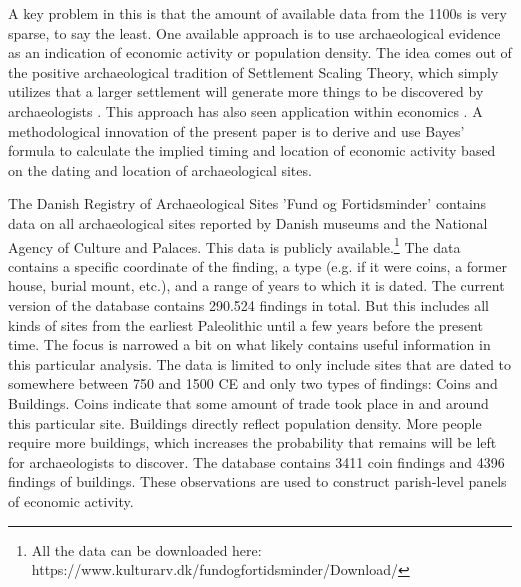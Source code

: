 \documentclass[11pt]{article}
\begin{document}
A key problem in this is that the amount of available data from the 1100s is very sparse, to say the least. One available approach is to use archaeological evidence as an indication of economic activity or population density. The idea comes out of the positive archaeological tradition of Settlement Scaling Theory, which simply utilizes that a larger settlement will generate more things to be discovered by archaeologists \citep{Ortman2020}. This approach has also seen application within economics \citep{Davis2002, Bakker2021Phonecians, Allen2023, Barjamovic2019}. A methodological innovation of the present paper is to derive and use Bayes' formula to calculate the implied timing and location of economic activity based on the dating and location of archaeological sites.

The Danish Registry of Archaeological Sites 'Fund og Fortidsminder' contains data on all archaeological sites reported by Danish museums and the National Agency of Culture and Palaces. This data is publicly available.\footnote{All the data can be downloaded here: https://www.kulturarv.dk/fundogfortidsminder/Download/} The data contains a specific coordinate of the finding, a type (e.g. if it were coins, a former house, burial mount, etc.), and a range of years to which it is dated. The current version of the database contains 290.524 findings in total. But this includes all kinds of sites from the earliest Paleolithic until a few years before the present time. The focus is narrowed a bit on what likely contains useful information in this particular analysis. The data is limited to only include sites that are dated to somewhere between 750 and 1500 CE and only two types of findings: Coins and Buildings. Coins indicate that some amount of trade took place in and around this particular site. Buildings directly reflect population density. More people require more buildings, which increases the probability that remains will be left for archaeologists to discover. The database contains 3411 coin findings and 4396 findings of buildings. These observations are used to construct parish-level panels of economic activity.
\end{document}
